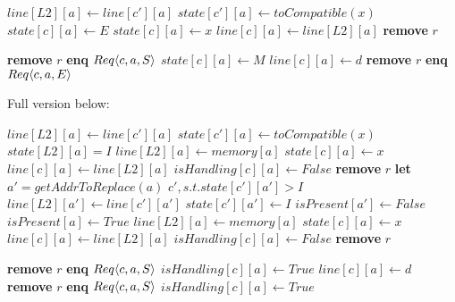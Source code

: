 \begin{algorithmic}
       \State $line[L2][a] \gets line[c'][a]$
    \EndIf
    \State $state[c'][a] \gets toCompatible(x)$
  \EndFor
     \State $state[c][a] \gets E$
  \Else
    \State $state[c][a] \gets x$
  \EndIf
    \State $line[c][a] \gets line[L2][a]$
  \EndIf
  \State \textbf{remove} $r$
\EndIf

      \State \textbf{remove} $r$
    \Else
      \State \textbf{enq} $\text{$Req\langle c,a,S\rangle$}$
    \EndIf
         \State $state[c][a] \gets M$
      \EndIf
      \State $line[c][a] \gets d$
      \State \textbf{remove} $r$
    \Else
      \State \textbf{enq} $\text{$Req\langle c,a,E\rangle$}$
    \EndIf
  \EndIf
\EndIf
\end{algorithmic}


Full version below:

\begin{algorithmic}
         \State $line[L2][a] \gets line[c'][a]$
      \EndIf
      \State $state[c'][a] \gets toCompatible(x)$
    \EndFor
    \If $state[L2][a] = I$
      \State $line[L2][a] \gets memory[a]$
    \EndIf
    \State $state[c][a] \gets x$
      \State $line[c][a] \gets line[L2][a]$
    \EndIf
    \State $isHandling[c][a] \gets False$
    \State \textbf{remove} $r$
  \Else
    \State \textbf{let} $a' = getAddrToReplace(a)$
    \ForAll $c', s.t. state[c'][a'] > I$
         \State $line[L2][a'] \gets line[c'][a']$
      \EndIf
      \State $state[c'][a'] \gets I$
    \EndFor
    \State $isPresent[a'] \gets False$
    \State $isPresent[a] \gets True$
    \State $line[L2][a] \gets memory[a]$
    \State $state[c][a] \gets x$
      \State $line[c][a] \gets line[L2][a]$
    \EndIf
    \State $isHandling[c][a] \gets False$
    \State \textbf{remove} $r$
  \EndIf
\EndIf

      \State \textbf{remove} $r$
    \Else
      \State \textbf{enq} $\text{$Req\langle c,a,S\rangle$}$
      \State $isHandling[c][a] \gets True$
    \EndIf
      \State $line[c][a] \gets d$
      \State \textbf{remove} $r$
    \Else
      \State \textbf{enq} $\text{$Req\langle c,a,S\rangle$}$
      \State $isHandling[c][a] \gets True$
    \EndIf
  \EndIf
\EndIf
\end{algorithmic}
